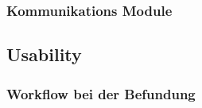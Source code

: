 \subsubsection{Kommunikations Module}
\label{sec:Kommunikations Module}

\subsection{Usability}
\label{sec:Usability}

\subsubsection{Workflow bei der Befundung}
\label{sec:Workflow bei der Befundung}

